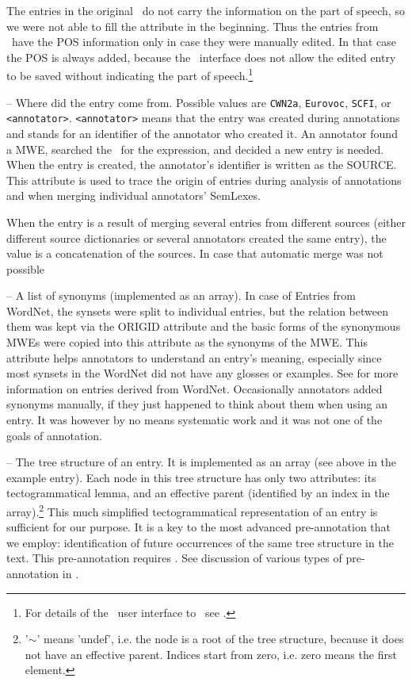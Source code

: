 \begin{description}
The entries in the original \scfi\ do not carry the information on the part of speech, so we were not able to fill the attribute in the beginning. Thus the entries from \scfi\ have the POS information only in case they were manually edited. In that case the POS is always added, because the \seman\ interface does not allow the edited entry to be saved without indicating the part of speech.\footnote{For details of the \seman\ user interface to \semlex\ see .} %

\item [SOURCE] -- Where did the entry come from. Possible values are {\tt CWN2a}, {\tt Eurovoc}, {\tt SCFI}, or {\tt <annotator>}. {\tt <annotator>} means that the entry was created during annotations and stands for an identifier of the annotator who created it. An annotator found a MWE, searched the \semlex\ for the expression, and decided a new entry is needed. When the entry is created, the annotator's identifier is written as the SOURCE. This attribute is used to trace the origin of entries during analysis of annotations and when merging individual annotators' SemLexes. 

When the entry is a result of merging several entries from different sources (either different source dictionaries or several annotators created the same entry), the value is a concatenation of the sources. In case that automatic merge was not possible  

\item [SYNONYMS] -- A list of synonyms (implemented as an array). In case of Entries from WordNet, the synsets were split to individual entries, but the relation between them was kept via the ORIGID attribute and the basic forms of the synonymous MWEs were copied into this attribute as the synonyms of the MWE. This attribute helps annotators to understand an entry's meaning, especially since most synsets in the WordNet did not have any glosses or examples. See  for more information on entries derived from WordNet. Occasionally annotators added synonyms manually, if they just happened to think about them when using an entry. It was however by no means systematic work and it was not one of the goals of annotation.

\item [TREE\textunderscore{}STRUCT] -- The tree structure of an entry. It is implemented as an array (see above in the example entry). Each node in this tree structure has only two attributes: its tectogrammatical lemma, and an effective parent (identified by an index in the array).\footnote{'$\sim$' means 'undef', i.e. the node is a root of the tree structure, because it does not have an effective parent. Indices start from zero, i.e. zero means the first element.} 
This much simplified tectogrammatical representation of an entry is sufficient for our purpose. It is a key to the most advanced pre-annotation that we employ: identification of future occurrences of the same tree structure in the text. This pre-annotation requires \ntred. See discussion of various types of pre-annotation in .

\end{description} %
